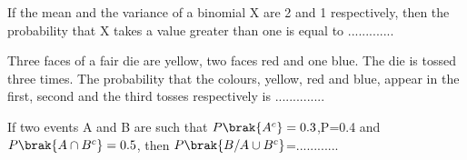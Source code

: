     \item If the mean and the variance of a binomial X are 2 and 1 respectively, then the probability that X takes a value greater than one is equal to .............\hfill{}\\ 
    \item Three faces of a fair die are yellow, two faces red and one blue. The die is tossed three times. The probability that the colours, yellow, red and blue, appear in the first, second and the third tosses  respectively is ..............\hfill{}\\
    \item If two events A and B are such that $P\brak{A^{c}}=0.3$,P=0.4 and $P\brak{A \cap B^{c}}=0.5$, then $P\brak{B/A \cup B^{c}}$=............ \hfill{}\\\\
